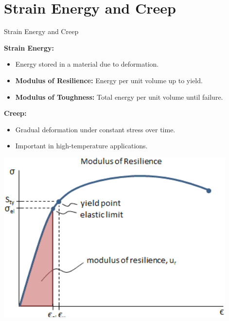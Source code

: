 \documentclass{beamer}
\begin{document}
\section{Strain Energy and Creep}
\begin{frame}{Strain Energy and Creep}
    \begin{minipage}[t]{0.49\textwidth}
        \textbf{Strain Energy:}
        \begin{itemize}
            \item Energy stored in a material due to deformation.
            \item \textbf{Modulus of Resilience:} Energy per unit volume up to yield.
            \item \textbf{Modulus of Toughness:} Total energy per unit volume until failure.
        \end{itemize}
        \vspace{0.5cm}
        \textbf{Creep:}
        \begin{itemize}
            \item Gradual deformation under constant stress over time.
            \item Important in high-temperature applications.
        \end{itemize}
    \end{minipage}
    \hfill
    \begin{minipage}[t]{0.45\textwidth}
        \vspace{1pt}
        \includegraphics[width=\textwidth]{Creep.png}
        \vspace{2pt}

\end{minipage}
\end{frame}
\end{document}
